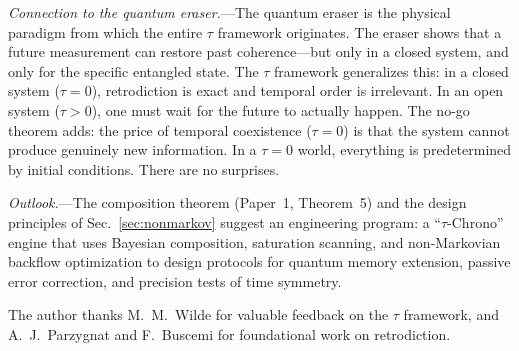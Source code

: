 \documentclass[prl,twocolumn,superscriptaddress,longbibliography,floatfix]{revtex4-2}
\newcommand{\tauasym}{\tau}
\begin{document}
\emph{Connection to the quantum eraser.}---The quantum eraser is the
physical paradigm from which the entire $\tauasym$ framework
originates.  The eraser shows that a future measurement can restore
past coherence---but only in a closed system, and only for the
specific entangled state.  The $\tauasym$ framework generalizes this:
in a closed system ($\tauasym = 0$), retrodiction is exact and
temporal order is irrelevant.  In an open system ($\tauasym > 0$),
one must wait for the future to actually happen.  The no-go theorem
adds: the price of temporal coexistence ($\tauasym = 0$) is
that the system cannot produce genuinely new information.  In a
$\tauasym = 0$ world, everything is predetermined by initial
conditions.  There are no surprises.

\emph{Outlook.}---The composition theorem (Paper~1, Theorem~5) and the
design principles of Sec.~\ref{sec:nonmarkov} suggest an engineering
program: a ``$\tauasym$-Chrono'' engine that uses Bayesian
composition, saturation scanning, and non-Markovian backflow
optimization to design protocols for quantum memory extension, passive
error correction, and precision tests of time symmetry.

\begin{acknowledgments}
The author thanks M.~M.~Wilde for valuable feedback on the
$\tauasym$ framework, and A.~J.~Parzygnat and F.~Buscemi for
foundational work on retrodiction.
\end{acknowledgments}

\end{document}
